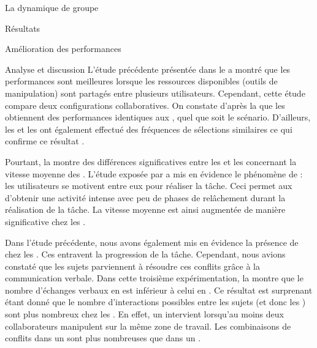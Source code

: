 \documentclass[myfrancais]{mythesis}
\begin{document}
\begin{mychapter}{La dynamique de groupe}
\begin{mysection}{Résultats}
\begin{mysubsection}{Amélioration des performances}
\begin{mysubsubsection}{Analyse et discussion}
					L'étude précédente présentée dans le  a montré que les performances sont meilleures lorsque les ressources disponibles (outils de manipulation) sont partagés entre plusieurs utilisateurs.
					Cependant, cette étude compare deux configurations collaboratives.
					On constate d'après la  que les  obtiennent des performances identiques aux , quel que soit le scénario.
					D'ailleurs, les  et les  ont également effectué des fréquences de sélections similaires ce qui confirme ce résultat .

					Pourtant, la  montre des différences significatives entre les  et les  concernant la vitesse moyenne des .
					L'étude exposée par  a mis en évidence le phénomène de  : les utilisateurs se motivent entre eux pour réaliser la tâche.
					Ceci permet aux  d'obtenir une activité intense avec peu de phases de relâchement durant la réalisation de la tâche.
					La vitesse moyenne est ainsi augmentée de manière significative chez les .

					Dans l'étude précédente, nous avons également mis en évidence la présence de  chez les .
					Ces  entravent la progression de la tâche.
					Cependant, nous avions constaté que les sujets parviennent à résoudre ces conflits grâce à la communication verbale.
					Dans cette troisième expérimentation, la  montre que le nombre d'échanges verbaux en  est inférieur à celui en .
					Ce résultat est surprenant étant donné que le nombre d'interactions possibles entre les sujets (et donc les ) sont plus nombreux chez les .
					En effet, un  intervient lorsqu'au moins deux collaborateurs manipulent sur la même zone de travail.
					Les combinaisons de conflits dans un  sont plus nombreuses que dans un .


\end{mysubsubsection}
\end{mysubsection}
\end{mysection}
\end{mychapter}
\end{document}
